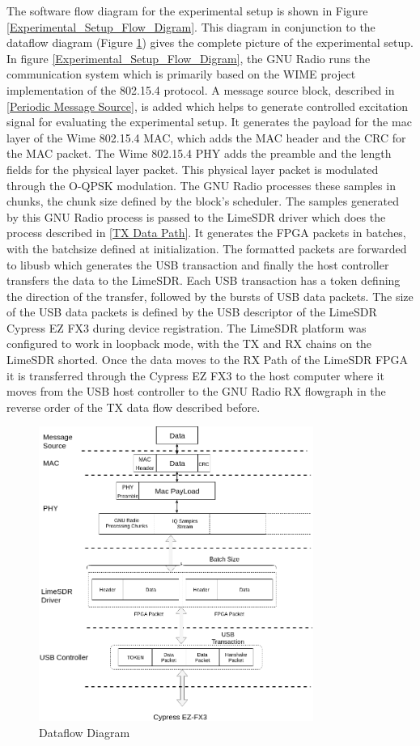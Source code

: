 The software flow diagram for the experimental setup is shown in Figure \ref{Experimental_Setup_Flow_Digram}.
This diagram in conjunction to the dataflow diagram (Figure \ref{Dataflow}) gives the complete picture of the experimental setup.
In figure \ref{Experimental_Setup_Flow_Digram}, the GNU Radio runs the communication system which is primarily based on the WIME project implementation of the 802.15.4 protocol.
A message source block, described in \ref{Periodic Message Source}, is added which helps to generate controlled excitation signal for evaluating the experimental setup.
It generates the payload for the \ac{mac} layer of the Wime 802.15.4 MAC, which adds the MAC header and the \ac{CRC} for the MAC packet.
The Wime 802.15.4 PHY adds the preamble and the length fields for the physical layer packet.
This physical layer packet is modulated through the O-QPSK modulation.
The GNU Radio processes these samples in chunks, the chunk size defined by the block's scheduler.
The samples generated by this GNU Radio process is passed to the LimeSDR driver which does the process described in \ref{TX Data Path}.
It generates the FPGA packets in batches, with the batchsize defined at initialization.
The formatted packets are forwarded to libusb which generates the USB transaction and finally the host controller transfers the data to the LimeSDR.
Each USB transaction has a token defining the direction of the transfer, followed by the bursts of USB data packets.
The size of the USB data packets is defined by the USB descriptor of the LimeSDR Cypress EZ FX3 during device registration.
The LimeSDR platform was configured to work in loopback mode, with the TX and RX chains on the LimeSDR shorted.
Once the data moves to the RX Path of the LimeSDR FPGA it is transferred through the Cypress EZ FX3 to the host computer where it moves from the USB host controller to the GNU Radio RX flowgraph in the reverse order of the TX data flow described before.


\begin{figure}[h!]
\centering
\includegraphics[width=0.8\textwidth]{Thesis/Figure/Dataflow.png}
\caption{Dataflow Diagram}
\label{Dataflow}
\end{figure}


